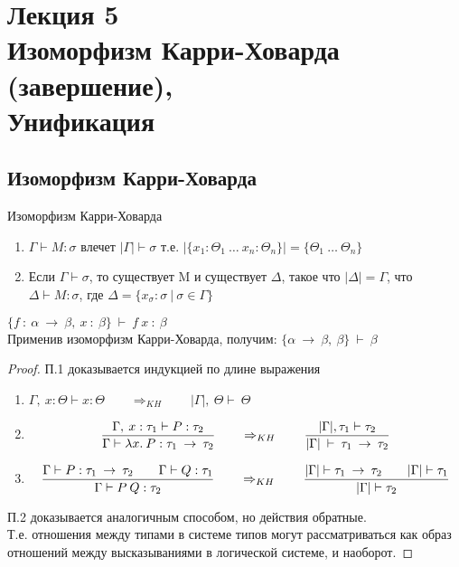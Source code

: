 \section{Лекция 5 \\ Изоморфизм Карри-Ховарда (завершение), \\Унификация}
		\subsection{Изоморфизм Карри-Ховарда}
	\begin{definition}Изоморфизм Карри-Ховарда\end{definition}

	\begin{enumerate}
		\item $\Gamma\vdash M:\sigma$ влечет $|\Gamma|\vdash \sigma$ т.е. $|\{x_1:\Theta_1\:\hdots \:x_n:\Theta_n\}|=\{\Theta_1\:\hdots\:\Theta_n\}$
		\item Если $\Gamma\vdash\sigma$, то существует M и существует $\Delta$, такое что $|\Delta|=\Gamma$, что $\Delta \vdash M: \sigma$, где $\Delta=\{x_{\sigma} : \sigma\:|\:\sigma\in\Gamma  \}$
	\end{enumerate}
	\begin{example}
	$\{f\: :\:\alpha\:\rightarrow\:\beta,\:x\: :\:\beta\}\:\vdash\:f\:x\::\:\beta$ \\Применив изоморфизм Карри-Ховарда, получим: $\{\alpha\:\rightarrow\:\beta,\:\beta\}\:\vdash\:\beta$
	\end{example}
	\begin{proof}
		\par П.1 доказывается индукцией по длине выражения
			\begin{enumerate}
				\item $\Gamma,\:x:\Theta\vdash x:\Theta \qquad \Rightarrow_{KH} \qquad |\Gamma|,\:\Theta\vdash\:\Theta$
				\item $${\Gamma,\:x:\tau_1\vdash P:\tau_2 \over \Gamma \vdash \lambda x.\:P:\tau_1\:\rightarrow\:\tau_2} \qquad \Rightarrow_{KH} \qquad {|\Gamma|, \tau_1\vdash\tau_2\over |\Gamma|\:\vdash\:\tau_1\:\rightarrow\:\tau_2}$$
				\item $${\Gamma\vdash P:\tau_1\:\rightarrow\:\tau_2 \hspace{2em} \Gamma\vdash Q:\tau_1 \over \Gamma \vdash P\:Q:\tau_2} \qquad \Rightarrow_{KH} \qquad {|\Gamma|\vdash \tau_1\:\rightarrow\:\tau_2 \hspace{2em} |\Gamma|\vdash \tau_1 \over |\Gamma| \vdash \tau_2}$$
			\end{enumerate}
\par П.2 доказывается аналогичным способом, но действия обратные.\\
Т.е. отношения между типами в системе типов могут рассматриваться как образ отношений между высказываниями в логической системе, и наоборот.
\end{proof}

